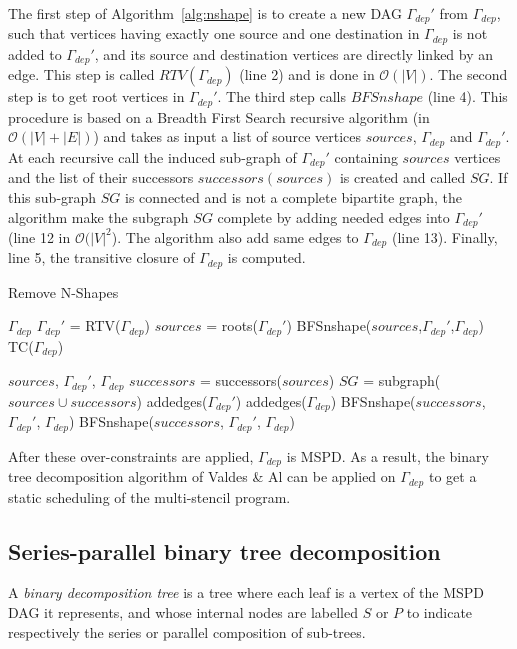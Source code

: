 The first step of Algorithm~\ref{alg:nshape} is to create a new DAG $\Gamma_{dep}'$ from $\Gamma_{dep}$, such that vertices having exactly one source and one destination in $\Gamma_{dep}$ is not added to $\Gamma_{dep}'$, and its source and destination vertices are directly linked by an edge. This step is called $RTV(\Gamma_{dep})$ (line 2) and is done in $\mathcal{O}(|V|)$. The second step is to get root vertices in $\Gamma_{dep}'$. The third step calls $BFSnshape$ (line 4). This procedure is based on a Breadth First Search recursive algorithm (in $\mathcal{O}(|V|+|E|)$) and takes as input a list of source vertices $sources$, $\Gamma_{dep}$ and $\Gamma_{dep}'$. At each recursive call the induced sub-graph of $\Gamma_{dep}'$ containing $sources$ vertices and the list of their successors $successors(sources)$ is created and called $SG$. If this sub-graph $SG$ is connected and is not a complete bipartite graph, the algorithm make the subgraph $SG$ complete by adding needed edges into $\Gamma_{dep}'$ (line 12 in $\mathcal{O}(|V|^2$). The algorithm also add same edges to $\Gamma_{dep}$ (line 13). Finally, line 5, the transitive closure of $\Gamma_{dep}$ is computed.

\begin{algorithm}
\caption{Remove N-Shapes}
\label{alg:nshape}
\begin{algorithmic}[1]
 {$\Gamma_{dep}$}
\State $\Gamma_{dep}'$ = RTV($\Gamma_{dep}$)
\State $sources$ = roots($\Gamma_{dep}'$)
\State BFSnshape($sources$,$\Gamma_{dep}'$,$\Gamma_{dep}$)
\State TC($\Gamma_{dep}$)
\EndProcedure

 {$sources$, $\Gamma_{dep}'$, $\Gamma_{dep}$}
\State $successors$ = successors($sources$)
\State $SG$ = subgraph($sources \cup successors$)
\State addedges($\Gamma_{dep}'$)
\State addedges($\Gamma_{dep}$)
\State BFSnshape($successors$, $\Gamma_{dep}'$, $\Gamma_{dep}$)
\State BFSnshape($successors$, $\Gamma_{dep}'$, $\Gamma_{dep}$)
\EndIf
\EndIf
\EndProcedure
\end{algorithmic}
\end{algorithm}

After these over-constraints are applied, $\Gamma_{dep}$ is MSPD. As a result, the binary tree decomposition algorithm of Valdes \& Al can be applied on $\Gamma_{dep}$ to get a static scheduling of the multi-stencil program.

\subsection{Series-parallel binary tree decomposition}
A \emph{binary decomposition tree} is a tree where each leaf is a vertex of the MSPD DAG it represents, and whose internal nodes are labelled $S$ or $P$ to indicate respectively the series or parallel composition of sub-trees.

